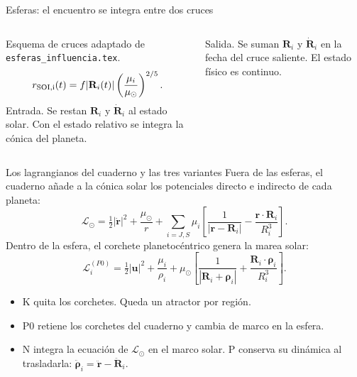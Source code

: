 \documentclass[aspectratio=169,11pt]{beamer}
\begin{document}
\begin{frame}{Esferas: el encuentro se integra entre dos cruces}
\begin{columns}[T]
\centering
{}
\par\small Esquema de cruces adaptado de \texttt{esferas\_influencia.tex}.
\[
r_{\rm SOI,i}(t)=f|\mathbf R_i(t)|
\left(\frac{\mu_i}{\mu_\odot}\right)^{2/5}.
\]
\small Entrada. Se restan $\mathbf R_i$ y $\dot{\mathbf R}_i$ al estado solar. Con el estado relativo se integra la cónica del planeta.
\medskip

Salida. Se suman $\mathbf R_i$ y $\dot{\mathbf R}_i$ en la fecha del cruce saliente. El estado físico es continuo.
\end{columns}
\end{frame}

\begin{frame}{Los lagrangianos del cuaderno y las tres variantes}
\small
Fuera de las esferas, el cuaderno añade a la cónica solar los potenciales directo e indirecto de cada planeta:
\[
\mathcal L_\odot=\tfrac12|\dot{\mathbf r}|^2+\frac{\mu_\odot}{r}
+\sum_{i=J,S}\mu_i\left[\frac1{|\mathbf r-\mathbf R_i|}
-\frac{\mathbf r\cdot\mathbf R_i}{R_i^3}\right].
\]
Dentro de la esfera, el corchete planetocéntrico genera la marea solar:
\[
\mathcal L_i^{(P0)}=\tfrac12|\mathbf u|^2+\frac{\mu_i}{\rho_i}
+\mu_\odot\left[\frac1{|\mathbf R_i+\boldsymbol\rho_i|}
+\frac{\mathbf R_i\cdot\boldsymbol\rho_i}{R_i^3}\right].
\]
\begin{itemize}
\item K quita los corchetes. Queda un atractor por región.
\item P0 retiene los corchetes del cuaderno y cambia de marco en la esfera.
\item N integra la ecuación de $\mathcal L_\odot$ en el marco solar. P conserva su dinámica al trasladarla: $\ddot{\boldsymbol\rho}_i=\ddot{\mathbf r}-\ddot{\mathbf R}_i$.
\end{itemize}
\end{frame}
\end{document}
